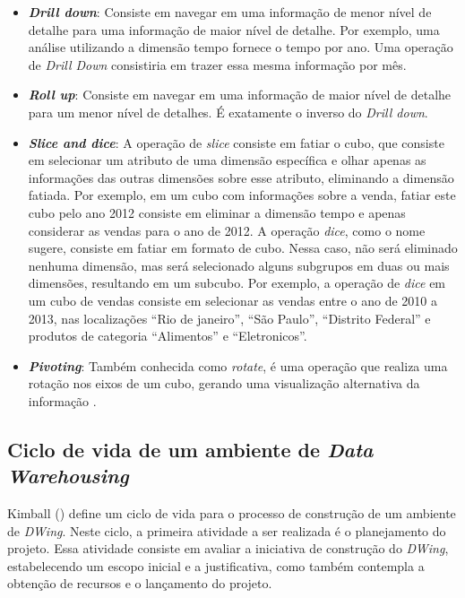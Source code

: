\begin{itemize}

	\item \textbf{\emph{Drill down}}: Consiste em navegar em uma informação de menor nível de detalhe para uma informação de maior nível de detalhe. Por exemplo, uma análise utilizando a dimensão tempo fornece o tempo por ano. Uma operação de \emph{Drill Down} consistiria em trazer essa mesma informação por mês.

	\item \textbf{\emph{Roll up}}: Consiste em navegar em uma informação de maior nível de detalhe para um menor nível de detalhes. É exatamente o inverso do \emph{Drill down}.

	\item \textbf{\emph{Slice and dice}}: A operação de \emph{slice} consiste em fatiar o cubo, que consiste em selecionar um atributo de uma dimensão específica e olhar apenas as informações das outras dimensões sobre esse atributo, eliminando a dimensão fatiada. Por exemplo, em um cubo com informações sobre a venda, fatiar este cubo pelo ano 2012 consiste em eliminar a dimensão tempo e apenas considerar as vendas para o ano de 2012. A operação \emph{dice}, como o nome sugere, consiste em fatiar em formato de cubo. Nessa caso, não será eliminado nenhuma dimensão, mas será selecionado alguns subgrupos em duas ou mais dimensões, resultando em um subcubo. Por exemplo,  a operação de \emph{dice} em um cubo de vendas consiste em selecionar as vendas entre o ano de 2010 a 2013, nas localizações “Rio de janeiro”, “São Paulo”, “Distrito Federal” e produtos de categoria “Alimentos” e “Eletronicos”.

	\item \textbf{\emph{Pivoting}}: Também conhecida como \emph{rotate}, é uma operação que realiza uma rotação nos eixos de um cubo, gerando uma visualização alternativa da informação \cite{cavalcanti2012}. 

\end{itemize}

\subsection{Ciclo de vida de um ambiente de \emph{Data Warehousing}}
\label{sec-lifecycleDw}

Kimball (\citeyear{kimball2002}) define um ciclo de vida para o processo de construção de um ambiente de \emph{DWing}. Neste ciclo, a primeira atividade a ser realizada é o planejamento do projeto. Essa atividade consiste em avaliar a iniciativa de construção do \emph{DWing}, estabelecendo um escopo inicial e a justificativa, como também contempla a obtenção  de recursos e o lançamento do projeto.

